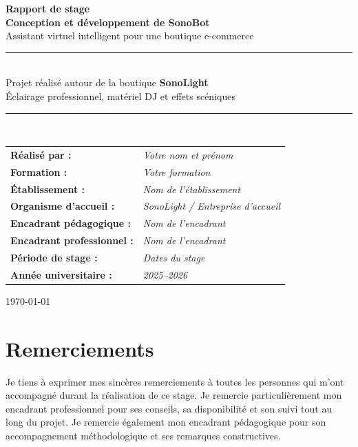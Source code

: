 \documentclass[12pt,a4paper]{report}
\begin{document}
\begin{titlepage}
    \centering
    \vspace*{1cm}
    {\Large \textbf{Rapport de stage}}\\[1.5cm]
    {\Huge \textbf{Conception et développement de SonoBot}}\\[0.4cm]
    {\Large Assistant virtuel intelligent pour une boutique e-commerce}\\[1.5cm]

    \rule{\textwidth}{0.5pt}\\[0.5cm]
    {\large Projet réalisé autour de la boutique \textbf{SonoLight}}\\
    {\large Éclairage professionnel, matériel DJ et effets scéniques}\\[0.5cm]
    \rule{\textwidth}{0.5pt}\\[1.5cm]

    \begin{tabular}{>{\bfseries}p{5cm}p{8cm}}
        Réalisé par : & \textit{Votre nom et prénom} \\
        Formation : & \textit{Votre formation} \\
        Établissement : & \textit{Nom de l'établissement} \\
        Organisme d'accueil : & \textit{SonoLight / Entreprise d'accueil} \\
        Encadrant pédagogique : & \textit{Nom de l'encadrant} \\
        Encadrant professionnel : & \textit{Nom de l'encadrant} \\
        Période de stage : & \textit{Dates du stage} \\
        Année universitaire : & \textit{2025--2026} \\
    \end{tabular}

    \vfill
    {\large \today}
\end{titlepage}

\chapter*{Remerciements}

Je tiens à exprimer mes sincères remerciements à toutes les personnes qui m'ont accompagné durant la réalisation de ce stage. Je remercie particulièrement mon encadrant professionnel pour ses conseils, sa disponibilité et son suivi tout au long du projet. Je remercie également mon encadrant pédagogique pour son accompagnement méthodologique et ses remarques constructives.
\end{document}
